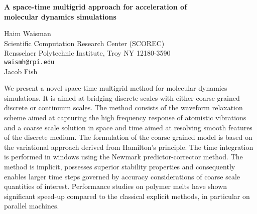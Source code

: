 \documentclass{report}
\begin{document}

\begin{center}
{\large
{\bf A space-time multigrid approach for acceleration of \\
	molecular dynamics simulations}}

	Haim Waisman \\
	Scientific Computation Research Center (SCOREC) \\
	Rensselaer Polytechnic Institute,  Troy NY 12180-3590 \\
	{\tt waismh@rpi.edu} \\
	Jacob Fish
\end{center}
We present a novel space-time multigrid method for molecular
dynamics simulations. It is aimed at bridging discrete
scales with either coarse grained discrete or continuum
scales. The method consists of the waveform relaxation
scheme aimed at capturing the high frequency response of
atomistic vibrations and a coarse scale solution in space
and time aimed at resolving smooth features of the discrete
medium. The formulation of the coarse grained model is based
on the variational approach derived from Hamilton's
principle. The time integration is performed in windows
using the Newmark predictor-corrector method. The method is
implicit, possesses superior stability properties and
consequently enables larger time steps governed by accuracy
considerations of coarse scale quantities of interest.
Performance studies on polymer melts have shown significant
speed-up compared to the classical explicit methods, in
particular on parallel machines.



\end{document}
